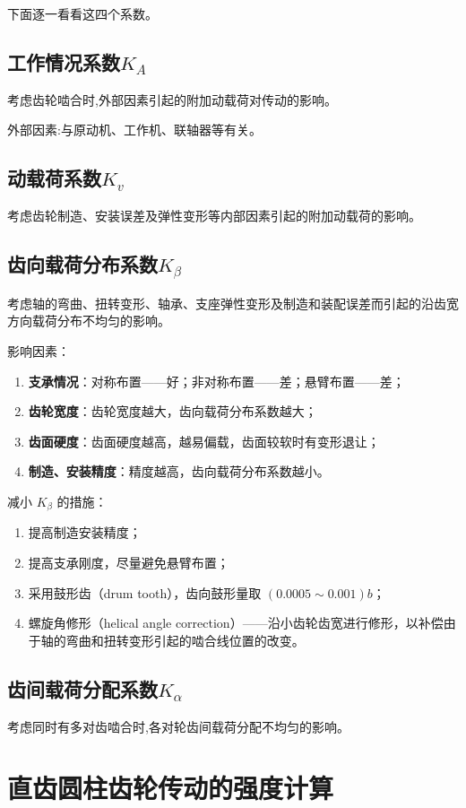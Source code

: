 下面逐一看看这四个系数。

\subsection{工作情况系数$K_{A}$}
考虑齿轮啮合时,外部因素引起的附加动载荷对传动的影响。

外部因素:与原动机、工作机、联轴器等有关。
\subsection{动载荷系数$K_{v}$}
考虑齿轮制造、安装误差及弹性变形等内部因素引起的附加动载荷的影响。

\subsection{齿向载荷分布系数$K_{\beta}$}
考虑轴的弯曲、扭转变形、轴承、支座弹性变形及制造和装配误差而引起的沿齿宽方向载荷分布不均匀的影响。

影响因素：
\begin{enumerate}
    \item \textbf{支承情况}：对称布置——好；非对称布置——差；悬臂布置——差；
    \item \textbf{齿轮宽度}：齿轮宽度越大，齿向载荷分布系数越大；
    \item \textbf{齿面硬度}：齿面硬度越高，越易偏载，齿面较软时有变形退让；
    \item \textbf{制造、安装精度}：精度越高，齿向载荷分布系数越小。
\end{enumerate}

减小 $K_{\beta}$ 的措施：
\begin{enumerate}
    \item 提高制造安装精度；
    \item 提高支承刚度，尽量避免悬臂布置；
    \item 采用鼓形齿（drum tooth），齿向鼓形量取 $(0.0005\sim0.001)b$；
    \item 螺旋角修形（helical angle correction）——沿小齿轮齿宽进行修形，以补偿由于轴的弯曲和扭转变形引起的啮合线位置的改变。
\end{enumerate}

\subsection{齿间载荷分配系数$K_{\alpha}$}
考虑同时有多对齿啮合时,各对轮齿间载荷分配不均匀的影响。

\section{直齿圆柱齿轮传动的强度计算}
